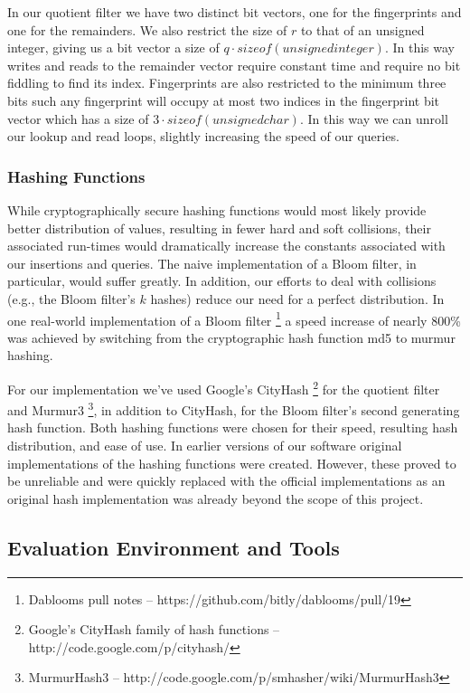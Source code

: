 \documentclass[twoside]{article}
\begin{document}
In our quotient filter we have two distinct bit vectors, one for the fingerprints and one for the remainders. We also restrict the size of $r$ to that of an unsigned integer, giving us a bit vector a size of $q\cdot sizeof(unsigned integer)$. In this way writes and reads to the remainder vector require constant time and require no bit fiddling to find its index. Fingerprints are also restricted to the minimum three bits such any fingerprint will occupy at most two indices in the fingerprint bit vector which has a size of $3\cdot sizeof(unsigned char)$. In this way we can unroll our lookup and read loops, slightly increasing the speed of our queries.

\subsubsection{Hashing Functions}

While cryptographically secure hashing functions would most likely provide better distribution of values, resulting in fewer hard and soft collisions, their associated run-times would dramatically increase the constants associated with our insertions and queries. The naive implementation of a Bloom filter, in particular, would suffer greatly. In addition, our efforts to deal with collisions (e.g., the Bloom filter's $k$ hashes) reduce our need for a perfect distribution. In one real-world implementation of a Bloom filter \footnote{Dablooms pull notes -- https://github.com/bitly/dablooms/pull/19} a speed increase of nearly 800\% was achieved by switching from the cryptographic hash function md5 to murmur hashing.

For our implementation we've used Google's CityHash \footnote{Google's CityHash family of hash functions -- http://code.google.com/p/cityhash/} for the quotient filter and Murmur3 \footnote{MurmurHash3 -- http://code.google.com/p/smhasher/wiki/MurmurHash3}, in addition to CityHash, for the Bloom filter's second generating hash function. Both hashing functions were chosen for their speed, resulting hash distribution, and ease of use. In earlier versions of our software original implementations of the hashing functions were created. However, these proved to be unreliable and were quickly replaced with the official implementations as an original hash implementation was already beyond the scope of this project.

\subsection{Evaluation Environment and Tools}
\end{document}

